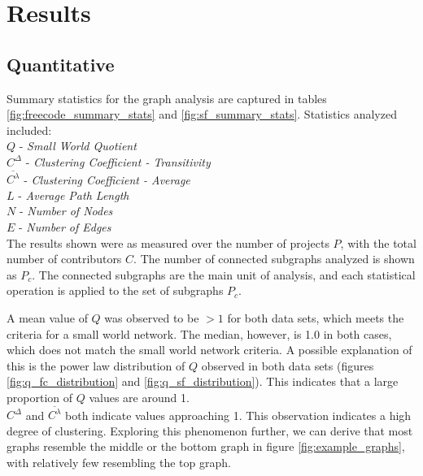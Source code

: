 \documentclass{proc}
\begin{document}
\section{Results}

\subsection{Quantitative}




Summary statistics for the graph analysis are captured in tables \ref{fig:freecode_summary_stats} and \ref{fig:sf_summary_stats}.  Statistics analyzed included:\\
$Q$ - \textit{Small World Quotient}\\
$C^\Delta$ - \textit{Clustering Coefficient - Transitivity}\\
$\overline{C^\lambda}$ - \textit{Clustering Coefficient - Average}\\
$L$ - \textit{Average Path Length}\\
$N$ - \textit{Number of Nodes}\\
$E$ - \textit{Number of Edges}\\
The results shown were as measured over the number of projects $P$, with the total number of contributors $C$. The number of connected subgraphs analyzed is shown as $P_c$. The connected subgraphs are the main unit of analysis, and each statistical operation is applied to the set of subgraphs $P_c$.

A mean value of $Q$ was observed to be $> 1$ for both data sets, which meets the criteria for a small world network\cite{humphries2008network}. The median, however, is 1.0 in both cases, which does not match the small world network criteria. A possible explanation of this is the power law distribution of $Q$ observed in both data sets (figures \ref{fig:q_fc_distribution} and \ref{fig:q_sf_distribution}). This indicates that a large proportion of $Q$ values are around 1.\\

$C^\Delta$ and $\overline{C^\lambda}$ both indicate values approaching 1. This observation indicates a high degree of clustering\cite{watts1998collective}. Exploring this phenomenon further, we can derive that most graphs resemble the middle or the bottom graph in figure \ref{fig:example_graphs}, with relatively few resembling the top graph.\\
\end{document}
